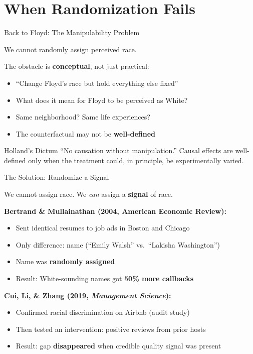 \documentclass[aspectratio=169, 11pt, handout]{beamer}
\begin{document}
\section{When Randomization Fails}

\begin{frame}{Back to Floyd: The Manipulability Problem}

We cannot randomly assign perceived race.

\bigskip

The obstacle is \textbf{conceptual}, not just practical:
\begin{itemize}
    \item ``Change Floyd's race but hold everything else fixed''
    \item What does it mean for Floyd to be perceived as White?
    \item Same neighborhood? Same life experiences?
    \item The counterfactual may not be \textbf{well-defined}
\end{itemize}

\bigskip
\pause

\begin{block}{Holland's Dictum}
``No causation without manipulation.'' Causal effects are well-defined only when the treatment could, in principle, be experimentally varied.
\end{block}
\end{frame}

\begin{frame}{The Solution: Randomize a Signal}

We cannot assign race. We \emph{can} assign a \textbf{signal} of race.

\bigskip

\textbf{Bertrand \& Mullainathan (2004, American Economic Review):}
\begin{itemize}
    \item Sent identical resumes to job ads in Boston and Chicago
    \item Only difference: name (``Emily Walsh'' vs.\ ``Lakisha Washington'')
    \item Name was \textbf{randomly assigned}
    \item Result: White-sounding names got \textbf{50\% more callbacks}
\end{itemize}

\bigskip
\pause

\textbf{Cui, Li, \& Zhang (2019, \emph{Management Science}):}
\begin{itemize}
    \item Confirmed racial discrimination on Airbnb (audit study)
    \item Then tested an intervention: positive reviews from prior hosts
    \item Result: gap \textbf{disappeared} when credible quality signal was present
\end{itemize}
\end{frame}
\end{document}
